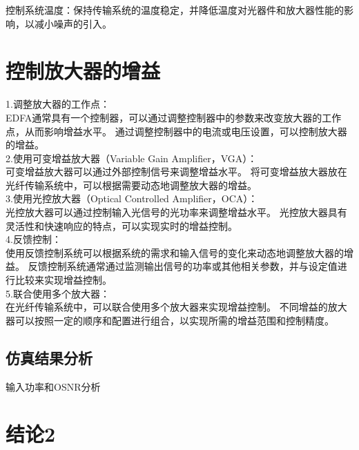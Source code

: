 \documentclass[12pt, a4paper, oneside]{article}
\begin{document}
\begin{spacing}{2.0}
控制系统温度：保持传输系统的温度稳定，并降低温度对光器件和放大器性能的影响，以减小噪声的引入。

\section{控制放大器的增益}

1.调整放大器的工作点：\\

EDFA通常具有一个控制器，可以通过调整控制器中的参数来改变放大器的工作点，从而影响增益水平。
通过调整控制器中的电流或电压设置，可以控制放大器的增益。\\
2.使用可变增益放大器（Variable Gain Amplifier，VGA）：
\\
可变增益放大器可以通过外部控制信号来调整增益水平。
将可变增益放大器放在光纤传输系统中，可以根据需要动态地调整放大器的增益。\\
3.使用光控放大器（Optical Controlled Amplifier，OCA）：
\\
光控放大器可以通过控制输入光信号的光功率来调整增益水平。
光控放大器具有灵活性和快速响应的特点，可以实现实时的增益控制。\\
4.反馈控制：
\\
使用反馈控制系统可以根据系统的需求和输入信号的变化来动态地调整放大器的增益。
反馈控制系统通常通过监测输出信号的功率或其他相关参数，并与设定值进行比较来实现增益控制。\\
5.联合使用多个放大器：
\\
在光纤传输系统中，可以联合使用多个放大器来实现增益控制。
不同增益的放大器可以按照一定的顺序和配置进行组合，以实现所需的增益范围和控制精度。

\subsection{仿真结果分析}
输入功率和OSNR分析

\section{结论2}

\end{spacing}{}


\end{document}
